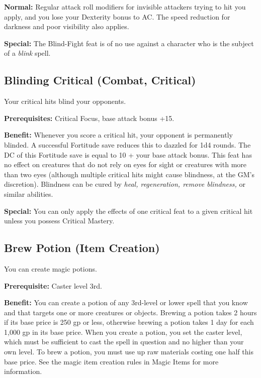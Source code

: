 \textbf{Normal:} Regular attack roll modifiers for invisible attackers trying to hit you apply, and you lose your Dexterity bonus to AC. The speed reduction for darkness and poor visibility also applies.
				
\textbf{Special:} The Blind-Fight feat is of no use against a character who is the subject of a \textit{blink }spell.
				
\subsection{Blinding Critical (Combat, Critical)}

				
Your critical hits blind your opponents.
				
\textbf{Prerequisites:} Critical Focus, base attack bonus +15.
				
\textbf{Benefit:} Whenever you score a critical hit, your opponent is permanently blinded. A successful Fortitude save reduces this to dazzled for 1d4 rounds. The DC of this Fortitude save is equal to 10 + your base attack bonus. This feat has no effect on creatures that do not rely on eyes for sight or creatures with more than two eyes (although multiple critical hits might cause blindness, at the GM's discretion). Blindness can be cured by \textit{heal, regeneration, remove blindness, }or similar abilities.
				
\textbf{Special:} You can only apply the effects of one critical feat to a given critical hit unless you possess Critical Mastery.
				
\subsection{Brew Potion (Item Creation)}

				
You can create magic potions.
				
\textbf{Prerequisite:} Caster level 3rd.
				
\textbf{Benefit:} You can create a potion of any 3rd-level or lower spell that you know and that targets one or more creatures or objects. Brewing a potion takes 2 hours if its base price is 250 gp or less, otherwise brewing a potion takes 1 day for each 1,000 gp in its base price. When you create a potion, you set the caster level, which must be sufficient to cast the spell in question and no higher than your own level. To brew a potion, you must use up raw materials costing one half this base price. See the magic item creation rules in Magic Items for more information.

